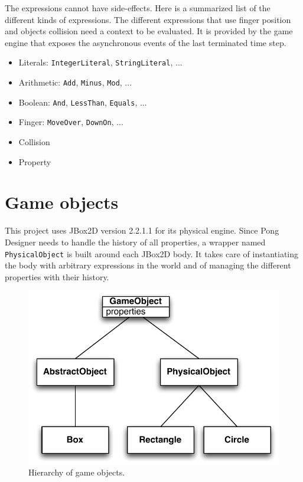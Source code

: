 \documentclass[11pt,a4paper]{article}
\begin{document}
The expressions cannot have side-effects. Here is a summarized list of the different kinds of expressions. The different expressions that use finger position and objects collision need a context to be evaluated. It is provided by the game engine that exposes the asynchronous events of the last terminated time step.
\begin{itemize}[noitemsep,topsep=2pt,parsep=1pt,partopsep=1pt]
\item Literals: \texttt{IntegerLiteral}, \texttt{StringLiteral}, ...
\item Arithmetic: \texttt{Add}, \texttt{Minus}, \texttt{Mod}, ...
\item Boolean: \texttt{And}, \texttt{LessThan}, \texttt{Equals}, ...
\item Finger: \texttt{MoveOver}, \texttt{DownOn}, ...
\item Collision
\item Property
\end{itemize}

\section{Game objects}
This project uses JBox2D version 2.2.1.1 for its physical engine. Since Pong Designer needs to handle the history of all properties, a wrapper named \texttt{PhysicalObject} is built around each JBox2D body. It takes care of instantiating the body with arbitrary expressions in the world and of managing the different properties with their history. 

\begin{figure}[h]
\centering
\includegraphics[scale = 0.7]{images/objects} 
\caption{Hierarchy of game objects.}
\label{fig:objects}
\end{figure}
\end{document}
